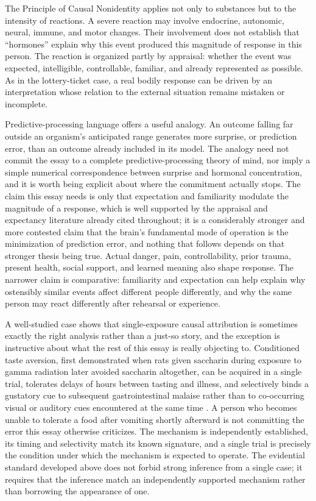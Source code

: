 \documentclass[11pt]{article}
\begin{document}
The Principle of Causal Nonidentity applies not only to substances but to the intensity of reactions. A severe reaction may involve endocrine, autonomic, neural, immune, and motor changes. Their involvement does not establish that ``hormones'' explain why this event produced this magnitude of response in this person. The reaction is organized partly by appraisal: whether the event was expected, intelligible, controllable, familiar, and already represented as possible. As in the lottery-ticket case, a real bodily response can be driven by an interpretation whose relation to the external situation remains mistaken or incomplete.

Predictive-processing language offers a useful analogy. An outcome falling far outside an organism's anticipated range generates more surprise, or prediction error, than an outcome already included in its model. The analogy need not commit the essay to a complete predictive-processing theory of mind, nor imply a simple numerical correspondence between surprise and hormonal concentration, and it is worth being explicit about where the commitment actually stops. The claim this essay needs is only that expectation and familiarity modulate the magnitude of a response, which is well supported by the appraisal and expectancy literature already cited throughout; it is a considerably stronger and more contested claim that the brain's fundamental mode of operation is the minimization of prediction error, and nothing that follows depends on that stronger thesis being true. Actual danger, pain, controllability, prior trauma, present health, social support, and learned meaning also shape response. The narrower claim is comparative: familiarity and expectation can help explain why ostensibly similar events affect different people differently, and why the same person may react differently after rehearsal or experience.

A well-studied case shows that single-exposure causal attribution is sometimes exactly the right analysis rather than a just-so story, and the exception is instructive about what the rest of this essay is really objecting to. Conditioned taste aversion, first demonstrated when rats given saccharin during exposure to gamma radiation later avoided saccharin altogether, can be acquired in a single trial, tolerates delays of hours between tasting and illness, and selectively binds a gustatory cue to subsequent gastrointestinal malaise rather than to co-occurring visual or auditory cues encountered at the same time \citep{garcia1955conditioned,garcia1966relation}. A person who becomes unable to tolerate a food after vomiting shortly afterward is not committing the error this essay otherwise criticizes. The mechanism is independently established, its timing and selectivity match its known signature, and a single trial is precisely the condition under which the mechanism is expected to operate. The evidential standard developed above does not forbid strong inference from a single case; it requires that the inference match an independently supported mechanism rather than borrowing the appearance of one.
\end{document}
